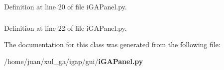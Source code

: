 Definition at line 20 of file iGAPanel.py.
\subsubsection{}\label{classgui_1_1iGAPanel_1_1iGAPanel_1d00daa1fef6778f98f206201f1ae13f}




Definition at line 22 of file iGAPanel.py.

The documentation for this class was generated from the following file:\begin{CompactItemize}
\item 
/home/juan/xul\_\-ga/igap/gui/{\bf iGAPanel.py}\end{CompactItemize}
